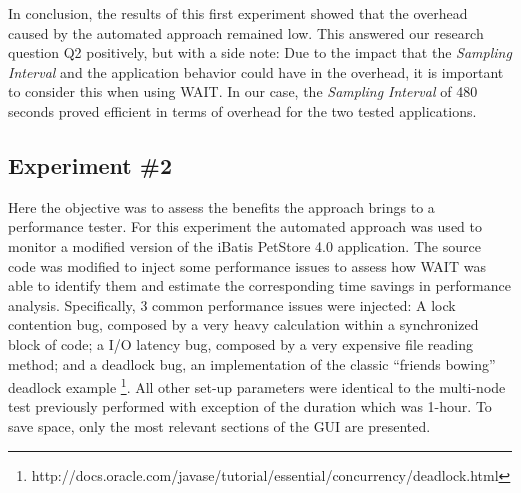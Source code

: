 \documentclass[runningheads,a4paper]{llncs}
\begin{document}

In conclusion, the results of this first experiment showed that the overhead
caused by the automated approach remained low. This answered our research
question Q2 positively, but with a side note: Due to the impact that the
\emph{Sampling Interval} and the application behavior could have in the
overhead, it is important to consider this when using WAIT. In our case, the
\emph{Sampling Interval} of 480 seconds proved efficient in terms of overhead for the two tested applications.

\subsection{Experiment \#2}

Here the objective was to assess the benefits the approach brings to a
performance tester. For this experiment the automated approach was used to
monitor a modified version of the iBatis PetStore 4.0 application. The source
code was modified to inject some performance issues to assess how WAIT was able
to identify them and estimate the corresponding time savings in performance
analysis. Specifically, 3 common performance issues were injected: A lock
contention bug, composed by a very heavy calculation within a synchronized block
of code; a I/O latency bug, composed by a very expensive file reading method;
and a deadlock bug, an implementation of the classic ``friends bowing'' deadlock example
\footnote{http://docs.oracle.com/javase/tutorial/essential/concurrency/deadlock.html}.
All other set-up parameters were identical to the multi-node test
previously performed with exception of the duration which was 1-hour. To save
space, only the most relevant sections of the GUI are presented.
\end{document}
